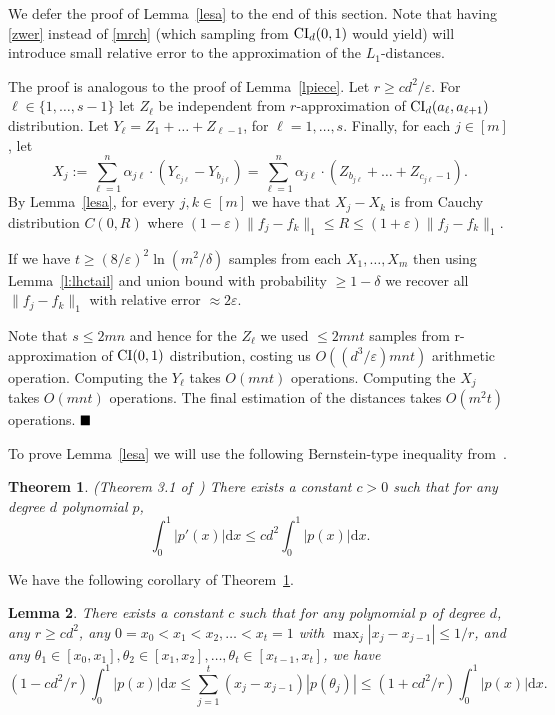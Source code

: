 \documentclass[11pt]{article}
\def\eps{\varepsilon}
\newtheorem{thm}{Theorem}[section]
\newtheorem{lem}[thm]{Lemma}
\newenvironment{prf}[1]{\noindent{\bf{Proof #1\\}}}{$\hfill\blacksquare$\nopagebreak[4]\vskip 0.3cm}
\def\BTHM{\begin{thm}}
\def\ETHM{\end{thm}}
\newcommand\BPRF[1][:]{\begin{prf}{#1}}
\def\EPRF{\end{prf}}
\def\BLEM{\begin{lem}}
\def\ELEM{\end{lem}}
\begin{document}
We defer the proof of Lemma~\ref{lesa} to the end of this section. Note that
having \eqref{zwer} instead of \eqref{mrch} (which sampling from ${\rm CI}_d(0,1)$ would yield)
will introduce small relative error to the approximation of the $L_1$-distances.

\vskip 0.2cm
\BPRF[of Theorem~\ref{trwe}:]
The proof is analogous to the proof of Lemma~\ref{lpiece}. Let $r\geq cd^2/\eps$.
For $\ell\in\{1,\dots,s-1\}$ let $Z_\ell$ be independent from
$r$-approximation of ${\rm CI}_d(a_\ell,a_{\ell+1})$ distribution.
Let
$Y_{\ell}=Z_1+\dots+Z_{\ell-1}$, for $\ell=1,\dots,s$. Finally, for each $j\in [m]$, let
\begin{equation*}\label{stint2B}
X_j:=\sum_{\ell=1}^n \alpha_{j\ell}\cdot (Y_{c_{j\ell}} - Y_{b_{j\ell}})=\sum_{\ell=1}^n\alpha_{j\ell}
\cdot (Z_{b_{j\ell}}+\dots+Z_{c_{j\ell}-1}).
\end{equation*}
By Lemma~\ref{lesa}, for every $j,k\in [m]$ we have that $X_j-X_k$ is from Cauchy distribution $C(0,R)$ where
$(1-\eps)\|f_j-f_k\|_1\leq R\leq (1+\eps)\|f_j-f_k\|_1$.

If we have $t\geq (8/\eps)^2\ln (m^2/\delta)$ samples from each $X_1,\dots,X_m$ then using
Lemma~\ref{l:lhctail} and union bound with probability $\geq 1-\delta$ we recover
all $\|f_j-f_k\|_1$ with relative error $\approx 2\eps$.

Note that $s\leq 2mn$ and hence for the $Z_\ell$ we used $\leq 2mnt$ samples from
r-approximation of ${\rm CI}(0,1)$ distribution, costing us $O((d^3/\eps) mnt)$ arithmetic operation.
Computing the $Y_\ell$ takes $O(mnt)$ operations. Computing the $X_j$ takes $O(mnt)$ operations.
The final estimation of the distances takes $O(m^2 t)$ operations.
\EPRF

To prove Lemma~\ref{lesa} we will use the following Bernstein-type inequality from~\cite{Erd00}.

\BTHM\label{l:erdelyi}
(Theorem 3.1 of~\cite{Erd00})
There exists a constant $c>0$ such that for any degree $d$ polynomial $p$,
\[ \int_{0}^{1} | p'(x) | \mbox{d} x \leq c d^2 \int_0^1 | p(x) | \mbox{d} x. \]
\ETHM

We have the following corollary of Theorem~\ref{l:erdelyi}.

\BLEM\label{l:interpolate}
There exists a constant $c$ such that for any polynomial $p$ of degree $d$,
any $r \geq cd^2$, any $0 = x_0 < x_1 < x_2, \ldots < x_t = 1$ with $\max_{j} |x_j - x_{j-1}| \leq 1/r$,
and any $\theta_1 \in [x_0, x_1], \theta_2 \in [x_1, x_2], \ldots, \theta_{t} \in [x_{t-1},x_t]$, we have
\begin{equation}\label{e:interpolate}
(1 - cd^2/r) \int_0^1 | p(x) | \mbox{d} x \leq \sum_{j=1}^{t} (x_j - x_{j-1}) | p(\theta_j) | \leq
(1 + cd^2/r) \int_0^1 | p(x) | \mbox{d} x.
\end{equation}
\ELEM
\end{document}
